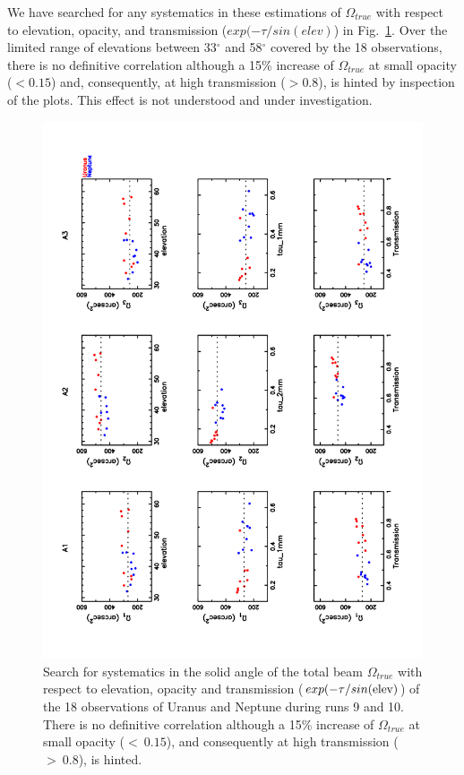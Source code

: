 We have searched for any systematics in these estimations of $\Omega_{true}$ with respect to elevation,
opacity,  and transmission ($exp(-\tau/sin(elev)$) in Fig.~\ref{fig:Osystematics}.
Over the limited range of elevations between  33$^{\circ}$ and 58$^{\circ}$ covered by the 18 observations,
there is no definitive correlation although
a 15\% increase of $\Omega_{true}$ at small opacity ($<0.15$) and, consequently,
at high transmission ($> 0.8$), is hinted by inspection of the plots.
This effect is not understood and under investigation. 

\begin{figure}[h]
\begin{center}
  \includegraphics[clip, angle=-90, scale=0.6]{Figures/Omega_True_vs_elev_tau_transmission.pdf}
  \caption{Search for systematics in the solid angle of the total beam $\Omega_{true}$
   with respect to elevation, opacity and transmission ($exp(-\tau/sin({\rm elev})$) of the 18 observations
   of Uranus and Neptune during runs 9 and 10. There is no definitive correlation although a 15\% increase
   of $\Omega_{true}$ at small opacity ($<~0.15$), and consequently
  at high transmission ($>~0.8$), is hinted.}
\label{fig:Osystematics}
\end{center}
\end{figure}


